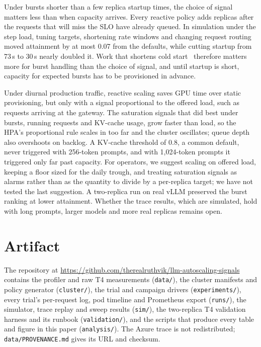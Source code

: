 \documentclass[10pt,conference]{IEEEtran}
\begin{document}
Under bursts shorter than a few replica startup times, the choice of signal
matters less than when capacity arrives. Every reactive policy adds replicas
after the requests that will miss the SLO have already queued. In simulation
under the step load, tuning targets, shortening rate windows and changing
request routing moved attainment by at most 0.07 from the defaults, while
cutting startup from 73\,s to 30\,s nearly doubled it. Work that shortens cold
start~\cite{fu2024serverlessllm,liu2026foundry,zhang2025blitzscale} therefore
matters more for burst handling than the choice of signal, and until startup
is short, capacity for expected bursts has to be provisioned in advance.

Under diurnal production traffic, reactive scaling saves GPU time over static
provisioning, but only with a signal proportional to the offered load, such
as requests arriving at the gateway. The saturation signals that did best
under bursts, running requests and KV-cache usage, grow faster than load, so
the HPA's proportional rule scales in too far and the cluster oscillates;
queue depth also overshoots on backlog. A KV-cache threshold of 0.8, a common
default, never triggered with 256-token prompts, and with 1{,}024-token
prompts it triggered only far past capacity. For operators, we suggest
scaling on offered load, keeping a floor sized for the daily trough, and
treating saturation signals as alarms rather than as the quantity to divide by
a per-replica target; we have not tested the last suggestion. A two-replica
run on real vLLM preserved the burst ranking at lower attainment. Whether the
trace results, which are simulated, hold with long prompts, larger models and
more real replicas remains open.

\section{Artifact}
\label{sec:artifact}
The repository at
\url{https://github.com/therealruthvik/llm-autoscaling-signals} contains the
profiler and raw T4 measurements (\texttt{data/}), the cluster manifests and
policy generator (\texttt{cluster/}), the trial and campaign drivers
(\texttt{experiments/}), every trial's per-request log, pod timeline and
Prometheus export (\texttt{runs/}), the simulator, trace replay and sweep
results (\texttt{sim/}), the two-replica T4 validation harness and its
runbook (\texttt{validation/}), and the scripts that produce every table and
figure in this paper (\texttt{analysis/}). The Azure trace is not
redistributed; \texttt{data/PROVENANCE.md} gives its URL and checksum.



\end{document}
